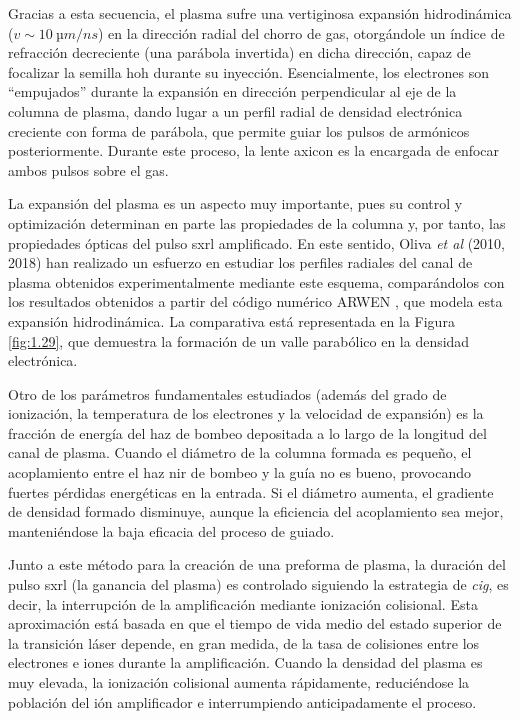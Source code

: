 Gracias a esta secuencia, el plasma sufre una vertiginosa expansión hidrodinámica ($v \sim \qty{10}{µm/ns}$) en la dirección radial del chorro de gas, otorgándole un índice de refracción decreciente (una parábola invertida) en dicha dirección, capaz de focalizar la semilla \acrshort{hoh} durante su inyección. Esencialmente, los electrones son \enquote{empujados} durante la expansión en dirección perpendicular al eje de la columna de plasma, dando lugar a un perfil radial de densidad electrónica creciente con forma de parábola, que permite guiar los pulsos de armónicos posteriormente. Durante este proceso, la lente axicon es la encargada de enfocar ambos pulsos sobre el gas.

La expansión del plasma es un aspecto muy importante, pues su control y optimización determinan en parte las propiedades de la columna y, por tanto, las propiedades ópticas del pulso \acrshort{sxrl} amplificado. En este sentido, Oliva \emph{et al} (2010, 2018) \autocite{Oliva2010,Oliva2018} han realizado un esfuerzo en estudiar los perfiles radiales del canal de plasma obtenidos experimentalmente mediante este esquema, comparándolos con los resultados obtenidos a partir del código numérico ARWEN \autocite{Ogando2001}, que modela esta expansión hidrodinámica. La comparativa está representada en la Figura \ref{fig:1.29}, que demuestra la formación de un valle parabólico en la densidad electrónica.

Otro de los parámetros fundamentales estudiados (además del grado de ionización, la temperatura de los electrones y la velocidad de expansión) es la fracción de energía del haz de bombeo depositada a lo largo de la longitud del canal de plasma. Cuando el diámetro de la columna formada es pequeño, el acoplamiento entre el haz \acrshort{nir} de bombeo y la guía no es bueno, provocando fuertes pérdidas energéticas en la entrada. Si el diámetro aumenta, el gradiente de densidad formado disminuye, aunque la eficiencia del acoplamiento sea mejor, manteniéndose la baja eficacia del proceso de guiado.

Junto a este método para la creación de una preforma de plasma, la duración del pulso \acrshort{sxrl} (la ganancia del plasma) es controlado siguiendo la estrategia de \emph{\acrfull{cig}}, es decir, la interrupción de la amplificación mediante ionización colisional. Esta aproximación está basada en que el tiempo de vida medio del estado superior de la transición láser depende, en gran medida, de la tasa de colisiones entre los electrones e iones durante la amplificación. Cuando la densidad del plasma es muy elevada, la ionización colisional aumenta rápidamente, reduciéndose la población del ión amplificador e interrumpiendo anticipadamente el proceso.

